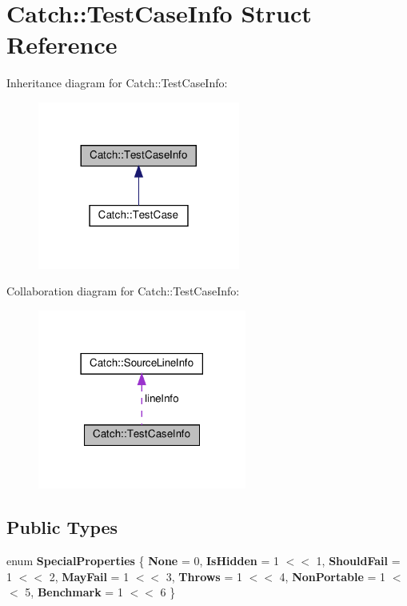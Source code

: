 \hypertarget{structCatch_1_1TestCaseInfo}{}\section{Catch\+:\+:Test\+Case\+Info Struct Reference}
\label{structCatch_1_1TestCaseInfo}


Inheritance diagram for Catch\+:\+:Test\+Case\+Info\+:
\nopagebreak
\begin{figure}[H]
\begin{center}
\leavevmode
\includegraphics[width=188pt]{structCatch_1_1TestCaseInfo__inherit__graph}
\end{center}
\end{figure}


Collaboration diagram for Catch\+:\+:Test\+Case\+Info\+:
\nopagebreak
\begin{figure}[H]
\begin{center}
\leavevmode
\includegraphics[width=194pt]{structCatch_1_1TestCaseInfo__coll__graph}
\end{center}
\end{figure}
\subsection*{Public Types}
\begin{DoxyCompactItemize}
\item 
\mbox{\label{structCatch_1_1TestCaseInfo_a39b232f74b4a7a6f2183b96759027eac}} 
enum {\bfseries Special\+Properties} \{ \newline
{\bfseries None} = 0, 
{\bfseries Is\+Hidden} = 1 $<$$<$ 1, 
{\bfseries Should\+Fail} = 1 $<$$<$ 2, 
{\bfseries May\+Fail} = 1 $<$$<$ 3, 
\newline
{\bfseries Throws} = 1 $<$$<$ 4, 
{\bfseries Non\+Portable} = 1 $<$$<$ 5, 
{\bfseries Benchmark} = 1 $<$$<$ 6
 \}
\end{DoxyCompactItemize}
